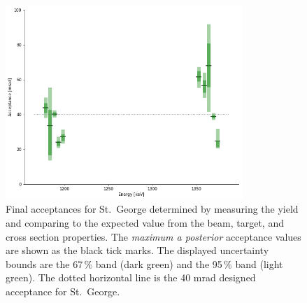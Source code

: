 \begin{figure}
    \begin{center}
        \label{fig:final-acceptance}
        \centerline{
            \includegraphics[width=0.8\textwidth]{figures/acceptance_uncertainty.png}}
        \caption[Final acceptances]{Final acceptances for St.\ George
            determined by measuring the \alpa{} yield and comparing to
            the expected value from the beam, target, and cross section
            properties. The \textit{maximum a posterior} acceptance
            values are shown as the black tick marks. The displayed
            uncertainty bounds are the 67\,\% band (dark green) and the
            95\,\% band (light green). The dotted horizontal line is the
            40 mrad designed acceptance for St.\ George.}
    \end{center}
\end{figure}


